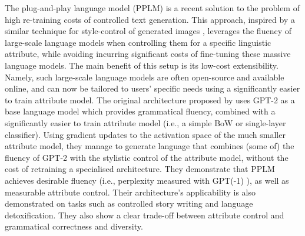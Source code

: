The plug-and-play language model (PPLM) \citep{dathathri2019plug} is a recent solution to the problem of high re-training costs of controlled text generation. This approach, inspired by a similar technique for style-control of generated images \citep{nguyen2017plug}, leverages the fluency of large-scale language models when controlling them for a specific linguistic attribute, while avoiding incurring significant costs of fine-tuning these massive language models. The main benefit of this setup is its low-cost extensibility. Namely, such large-scale language models are often open-source and available online, and can now be tailored to users' specific needs using a significantly easier to train attribute model. 
The original architecture proposed by \citeauthor{dathathri2019plug} uses GPT-2 as a base language model which provides grammatical fluency, combined with a significantly easier to train attribute model (i.e., a simple BoW or single-layer classifier). Using gradient updates to the activation space of the much smaller attribute model, they manage to generate language that combines (some of) the fluency of GPT-2 with the stylistic control of the attribute model, without the cost of retraining a specialised architecture. They demonstrate that PPLM achieves desirable fluency (i.e., perplexity measured with GPT(-1) \citep{radford2018improving}), as well as measurable attribute control. Their architecture's applicability is also demonstrated on tasks such as controlled story writing and language detoxification. They also show a clear trade-off between attribute control and grammatical correctness and diversity. 





